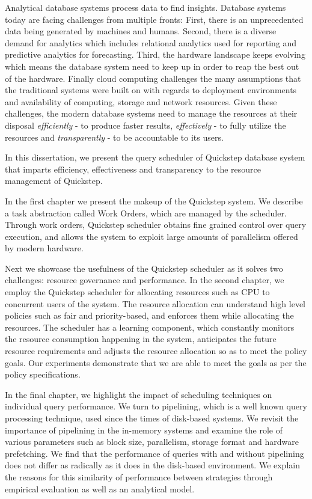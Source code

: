 Analytical database systems process data to find insights. 
Database systems today are facing challenges from multiple fronts: First, there is an unprecedented data being generated by machines and humans.
Second, there is a diverse demand for analytics which includes relational analytics used for reporting and predictive analytics for forecasting.
Third, the hardware landscape keeps evolving which means the database system need to keep up in order to reap the best out of the hardware.
Finally cloud computing challenges the many assumptions that the traditional systems were built on with regards to deployment environments and availability of computing, storage and network resources.
Given these challenges, the modern database systems need to manage the resources at their disposal \textit{efficiently} - to produce faster results, \textit{effectively} - to fully utilize the resources and \textit{transparently} - to be accountable to its users.

In this dissertation, we present the query scheduler of Quickstep database system that imparts efficiency, effectiveness and transparency to the resource management of Quickstep. 

In the first chapter we present the makeup of the Quickstep system. 
We describe a task abstraction called Work Orders, which are managed by the scheduler.
Through work orders, Quickstep scheduler obtains fine grained control over query execution, and allows the system to exploit large amounts of parallelism offered by modern hardware.

Next we showcase the usefulness of the Quickstep scheduler as it solves two challenges: resource governance and performance.
In the second chapter, we employ the Quickstep scheduler for allocating resources such as CPU to concurrent users of the system.
The resource allocation can understand high level policies such as fair and priority-based, and enforces them while allocating the resources.
The scheduler has a learning component, which constantly monitors the resource consumption happening in the system, anticipates the future resource requirements and adjusts the resource allocation so as to meet the policy goals.
Our experiments demonstrate that we are able to meet the goals as per the policy specifications.

In the final chapter, we highlight the impact of scheduling techniques on individual query performance.
We turn to pipelining, which is a well known query processing technique, used since the times of disk-based systems.
We revisit the importance of pipelining in the in-memory systems and examine the role of various parameters such as block size, parallelism, storage format and hardware prefetching.
We find that the performance of queries with and without pipelining does not differ as radically as it does in the disk-based environment.
We explain the reasons for this similarity of performance between strategies through empirical evaluation as well as an analytical model.